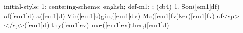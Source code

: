 initial-style: 1;
centering-scheme: english;
def-m1: \grealign;
(cb4) 1. Son([em1]df) of([em1]d) a([em1]d) Vir([em1]c)gin,([em1]dv) Ma([em1]fv)ker([em1]fv) of<sp> </sp>([em1]d) thy([em1]ev) mo-([em1]ev)ther,([em1]d)